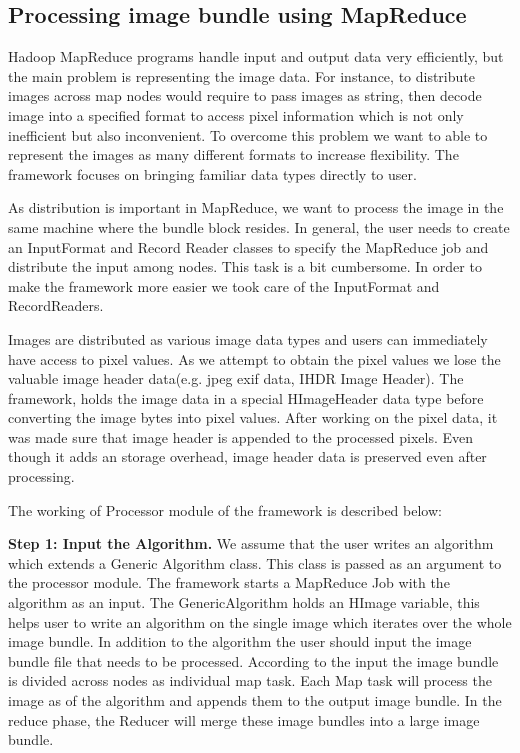 \documentclass[conference]{IEEEtran}
\begin{document}
\subsection{Processing image bundle using MapReduce}
Hadoop MapReduce programs handle input and output data very efficiently, but the main problem is representing the image data. For instance, to distribute images across map nodes would require to pass images as string, then decode image into a specified format to access pixel information which is not only inefficient but also inconvenient. To overcome this problem we want to able to represent the images as many different formats to increase flexibility. The framework focuses on bringing familiar data types directly to user.

As distribution is important in MapReduce, we want to process the image in the same machine where the bundle block resides. In general, the user needs to create an InputFormat and Record Reader classes to specify the MapReduce job and distribute the input among nodes. This task is a bit cumbersome. In order to make the framework more easier we took care of the InputFormat and RecordReaders.

Images are distributed as various image data types and users can immediately have access to pixel values. As we attempt to obtain the pixel values we lose the valuable image header data(e.g. jpeg exif data, IHDR\cite{David03} Image Header). The framework, holds the image data in a special HImageHeader data type before converting the image bytes into pixel values. After working on the pixel data, it was made sure that image header is appended to the processed pixels. Even though it adds an storage overhead, image header data is preserved even after processing.

The working of Processor module of the framework is described below:

\textbf{Step 1: Input the Algorithm.} We assume that the user writes an algorithm which extends a Generic Algorithm class. This class is passed as an argument to the processor module. The framework starts a MapReduce Job with the algorithm as an input. The GenericAlgorithm holds an HImage variable, this helps user to write an algorithm on the single image which iterates over the whole image bundle. In addition to the algorithm the user should input the image bundle file that needs to be processed. According to the input the image bundle is divided across nodes as individual map task. Each Map task will process the image as of the algorithm and appends them to the output image bundle. In the reduce phase, the Reducer will merge these image bundles into a large image bundle.
\end{document}
